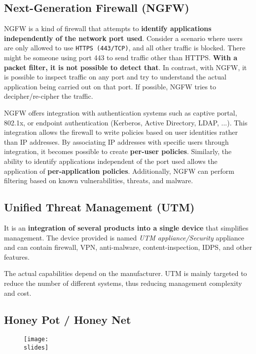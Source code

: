 \subsection{Next-Generation Firewall (NGFW)}
NGFW is a kind of firewall that attempts to \textbf{identify applications independently of the network port used}.
Consider a scenario where users are only allowed to use \texttt{HTTPS (443/TCP)}, and all other traffic is blocked. There might be someone using port 443 to send traffic other than HTTPS. \textbf{With a packet filter, it is not possible to detect that}. In contrast, with NGFW, it is possible to inspect traffic on any port and try to understand the actual application being carried out on that port. If possible, NGFW tries to decipher/re-cipher the traffic.

NGFW offers integration with authentication systems such as captive portal, 802.1x, or endpoint authentication (Kerberos, Active Directory, LDAP, ...). This integration allows the firewall to write policies based on user identities rather than IP addresses. By associating IP addresses with specific users through integration, it becomes possible to create \textbf{per-user policies}. Similarly, the ability to identify applications independent of the port used allows the application of \textbf{per-application policies}. Additionally, NGFW can perform filtering based on known vulnerabilities, threats, and malware.


\subsection{Unified Threat Management (UTM)}
It is an \textbf{integration of several products into a single device} that simplifies management. The device provided is named \textit{UTM appliance/Security} appliance and can contain firewall, VPN, anti-malware, content-inspection, IDPS, and other features. 

The actual capabilities depend on the manufacturer. UTM is mainly targeted to reduce the number of different systems, thus reducing management complexity and cost.

\subsection{Honey Pot / Honey Net}

\begin{figure}[h]
    \centering
    \texttt{[image: \\slides]}
    \label{Honey Pot / Honey Net}
\end{figure}

